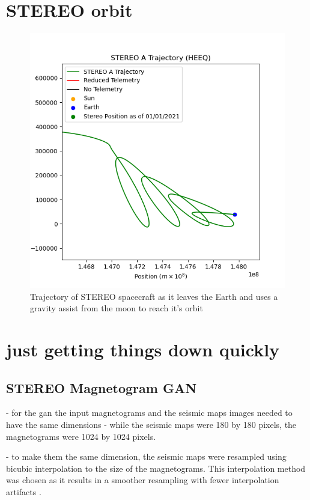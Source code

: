 \documentclass[11pt,a4paper,onecolumn]{report}
\begin{document}
\chapter{STEREO orbit}
\label{app:fun orbit}
\begin{figure}[ht]
  \centering
  \includegraphics[width=0.8\linewidth]{fun_orbit.png}
  \caption{Trajectory of STEREO spacecraft as it leaves the Earth and uses a gravity assist from the moon to reach it's orbit}
  \label{fig:fun_orbit}
\end{figure}

\chapter{just getting things down quickly}



\section{STEREO Magnetogram GAN}
- for the gan the input magnetograms and the seismic maps images needed to have
the same dimensions - while the seismic maps were 180 by 180 pixels, the
magnetograms were 1024 by 1024 pixels.




- to make them the same dimension, the seismic maps were resampled using bicubic
interpolation to the size of the magnetograms. This interpolation method was
chosen as it results in a smoother resampling with fewer interpolation artifacts
\citep{keys_cubic_1981}.
\end{document}
